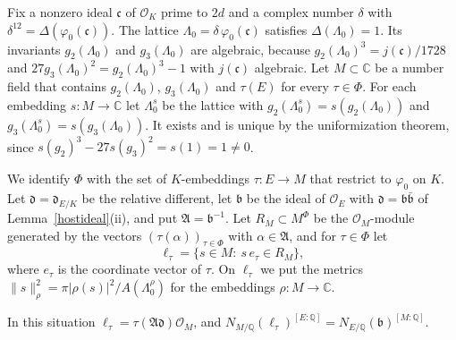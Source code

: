 Fix a nonzero ideal $\mathfrak c$ of $\mathcal O_K$ prime to $2d$ and a complex number $\delta$ with $\delta^{12}=\Delta(\varphi_0(\mathfrak c))$. The lattice $\Lambda_0=\delta\,\varphi_0(\mathfrak c)$ satisfies $\Delta(\Lambda_0)=1$. Its invariants $g_2(\Lambda_0)$ and $g_3(\Lambda_0)$ are algebraic, because $g_2(\Lambda_0)^3=j(\mathfrak c)/1728$ and $27g_3(\Lambda_0)^2=g_2(\Lambda_0)^3-1$ with $j(\mathfrak c)$ algebraic. Let $M\subset\mathbb C$ be a number field that contains $g_2(\Lambda_0)$, $g_3(\Lambda_0)$ and $\tau(E)$ for every $\tau\in\Phi$. For each embedding $s\colon M\to\mathbb C$ let $\Lambda_0^s$ be the lattice with $g_2(\Lambda_0^s)=s(g_2(\Lambda_0))$ and $g_3(\Lambda_0^s)=s(g_3(\Lambda_0))$. It exists and is unique by the uniformization theorem, since $s(g_2)^3-27s(g_3)^2=s(1)=1\ne0$.

We identify $\Phi$ with the set of $K$-embeddings $\tau\colon E\to M$ that restrict to $\varphi_0$ on $K$. Let $\mathfrak d=\mathfrak d_{E/K}$ be the relative different, let $\mathfrak b$ be the ideal of $\mathcal O_E$ with $\mathfrak d=\mathfrak b\bar{\mathfrak b}$ of Lemma~\ref{hostideal}(ii), and put $\mathfrak A=\mathfrak b^{-1}$. Let $R_M\subset M^\Phi$ be the $\mathcal O_M$-module generated by the vectors $(\tau(\alpha))_{\tau\in\Phi}$ with $\alpha\in\mathfrak A$, and for $\tau\in\Phi$ let
\[
\ell_\tau=\{s\in M:\ s\,e_\tau\in R_M\},
\]
where $e_\tau$ is the coordinate vector of $\tau$. On $\ell_\tau$ we put the metrics $\lVert s\rVert_\rho^2=\pi\lvert\rho(s)\rvert^2/A(\Lambda_0^\rho)$ for the embeddings $\rho\colon M\to\mathbb C$.

\begin{lemma}\label{r4:R4:coord}
In this situation $\ell_\tau=\tau(\mathfrak A\mathfrak d)\mathcal O_M$, and $N_{M/\mathbb Q}(\ell_\tau)^{[E:\mathbb Q]}=N_{E/\mathbb Q}(\mathfrak b)^{[M:\mathbb Q]}$.
\end{lemma}

